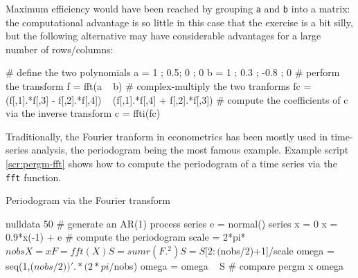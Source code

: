 Maximum efficiency would have been reached by grouping \texttt{a} and
\texttt{b} into a matrix: the computational advantage is so little in
this case that the exercise is a bit silly, but the following
alternative may have considerable advantages for a large number of
rows/columns:
\begin{code}
# define the two polynomials
a = { 1 ; 0.5; 0 ; 0 }
b = { 1 ; 0.3 ; -0.8 ; 0 }
# perform the transform
f = fft(a ~ b)
# complex-multiply the two tranforms 
fc = (f[,1].*f[,3] - f[,2].*f[,4]) ~ (f[,1].*f[,4] + f[,2].*f[,3]) 
# compute the coefficients of c via the inverse transform
c = ffti(fc)
\end{code}

Traditionally, the Fourier tranform in econometrics has been mostly
used in time-series analysis, the periodogram being the most famous
example. Example script \ref{scr:pergm-fft} shows how to compute the
periodogram of a time series via the \texttt{fft} function.

\begin{script}[htbp]
  \caption{Periodogram via the Fourier transform}
  \label{scr:pergm-fft}
\begin{scode}
nulldata 50
# generate an AR(1) process
series e = normal()
series x = 0
x = 0.9*x(-1) + e
# compute the periodogram
scale = 2*pi*$nobs
X = { x }
F = fft(X)
S = sumr(F.^2)
S = S[2:($nobs/2)+1]/scale
omega = seq(1,($nobs/2))' .* (2*pi/$nobs)
omega = omega ~ S
# compare
pergm x  
omega
\end{scode}
\end{script}



